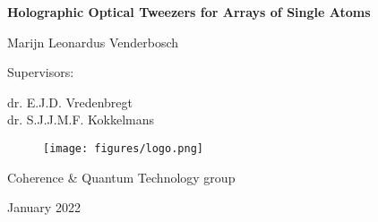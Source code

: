 
\begin{titlepage}
	\begin{centering}
		\vspace*{3cm}
		
		\textsf{\LARGE \textbf{Holographic Optical Tweezers for Arrays of Single Atoms}}
		
		\vspace{2.5cm}
		
		\textsf{\Large Marijn Leonardus Venderbosch}
		
		\vspace{2cm}
		
		\textsf{\large Supervisors:}
		
		\vspace{0.5cm}
		
		\textsf{\large dr. E.J.D. Vredenbregt\\
			dr. S.J.J.M.F. Kokkelmans
			}
		
		\vfill
		
		\begin{figure}[h]
			\centering
			\texttt{[image: figures/logo.png]}
		\end{figure}
		
		\textsf{Coherence \& Quantum Technology group}
		
		\vspace{0.4cm}		
		
		\textsf{January 2022}
		
		\vspace{1cm}
		
		
	\end{centering}
\end{titlepage}
\newpage


